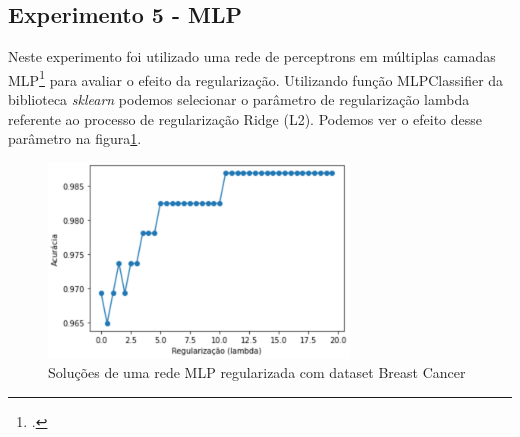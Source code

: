 \subsection*{Experimento 5 - MLP}

Neste experimento foi utilizado uma rede de perceptrons em múltiplas camadas MLP\footcite[]{Multilayer Perceptron} para avaliar o efeito da regularização.
Utilizando função MLPClassifier da biblioteca \emph{sklearn}\cite*[]{scikitlearn} podemos selecionar o parâmetro de regularização lambda referente ao processo de regularização Ridge (L2).
Podemos ver o efeito desse parâmetro na figura\ref*{img8}.

\begin{figure}[H]
    \center
    \includegraphics[width=8cm]{images/img12.png}
    \caption{\label{img8}Soluções de uma rede MLP regularizada com dataset Breast Cancer}
\end{figure}